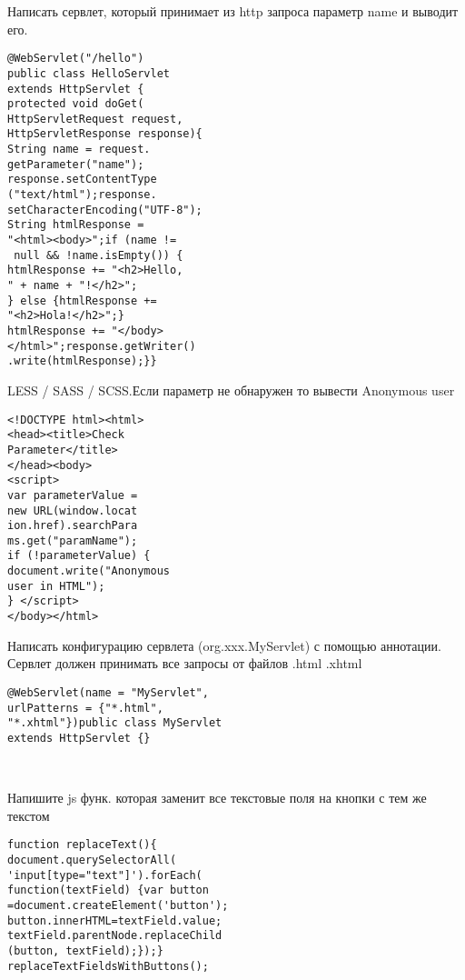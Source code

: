 \documentclass{article}
\begin{document}
\hfill
\begin{minipage}{.2\textwidth}
Написать сервлет, который принимает из http запроса параметр name и выводит его.
\begin{lstlisting}
@WebServlet("/hello")
public class HelloServlet 
extends HttpServlet {
protected void doGet(
HttpServletRequest request,
HttpServletResponse response){
String name = request.
getParameter("name");
response.setContentType
("text/html");response.
setCharacterEncoding("UTF-8");
String htmlResponse = 
"<html><body>";if (name !=
 null && !name.isEmpty()) {
htmlResponse += "<h2>Hello, 
" + name + "!</h2>";
} else {htmlResponse += 
"<h2>Hola!</h2>";}
htmlResponse += "</body>
</html>";response.getWriter()
.write(htmlResponse);}}
\end{lstlisting}
\end{minipage}
\hfill
\begin{minipage}{.2\textwidth}
LESS / SASS / SCSS.Если параметр не обнаружен то вывести Anonymous user
\begin{lstlisting}
<!DOCTYPE html><html>
<head><title>Check 
Parameter</title>
</head><body>
<script>
var parameterValue = 
new URL(window.locat
ion.href).searchPara
ms.get("paramName");
if (!parameterValue) {
document.write("Anonymous 
user in HTML");
} </script>
</body></html>
\end{lstlisting}
\end{minipage}
\hfill
\begin{minipage}{.2\textwidth}
Написать конфигурацию сервлета (org.xxx.MyServlet) с помощью аннотации. Сервлет должен принимать все запросы от файлов .html .xhtml
\begin{lstlisting}
@WebServlet(name = "MyServlet", 
urlPatterns = {"*.html", 
"*.xhtml"})public class MyServlet
extends HttpServlet {}
\end{lstlisting}
\end{minipage}
\\
\begin{minipage}{.2\textwidth}
Напишите js функ. которая заменит все текстовые поля на кнопки с тем же текстом
\begin{lstlisting}
function replaceText(){
document.querySelectorAll(
'input[type="text"]').forEach(
function(textField) {var button
=document.createElement('button');
button.innerHTML=textField.value;
textField.parentNode.replaceChild
(button, textField);});}
replaceTextFieldsWithButtons();
\end{lstlisting}
\end{minipage}
\hfill
\end{document}
